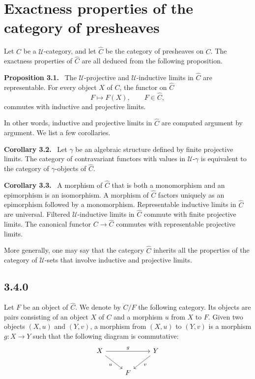 \documentclass[11pt]{article}
\newcommand{\U}{\mathcal{U}}
\newenvironment{statement}[1]{\par\medskip\noindent\textbf{#1.}\ }{\par\medskip}
\begin{document}
\section{Exactness properties of the category of presheaves}

Let $C$ be a $\U$-category, and let $\widehat C$ be the category of presheaves on $C$. The exactness properties of $\widehat C$ are all deduced from the following proposition.

\begin{statement}{Proposition 3.1}
The $\U$-projective and $\U$-inductive limits in $\widehat C$ are representable. For every object $X$ of $C$, the functor on $\widehat C$
\[
F\longmapsto F(X),\qquad F\in\widehat C,
\]
commutes with inductive and projective limits.

In other words, inductive and projective limits in $\widehat C$ are computed argument by argument. We list a few corollaries.
\end{statement}

\begin{statement}{Corollary 3.2}
Let $\gamma$ be an algebraic structure defined by finite projective limits. The category of contravariant functors with values in $\U$-$\gamma$ is equivalent to the category of $\gamma$-objects of $\widehat C$.
\end{statement}

\begin{statement}{Corollary 3.3}
A morphism of $\widehat C$ that is both a monomorphism and an epimorphism is an isomorphism. A morphism of $\widehat C$ factors uniquely as an epimorphism followed by a monomorphism. Representable inductive limits in $\widehat C$ are universal. Filtered $\U$-inductive limits in $\widehat C$ commute with finite projective limits. The canonical functor $C\to\widehat C$ commutes with representable projective limits.
\end{statement}

More generally, one may say that the category $\widehat C$ inherits all the properties of the category of $\U$-sets that involve inductive and projective limits.

\subsection*{3.4.0}
Let $F$ be an object of $\widehat C$. We denote by $C/F$ the following category. Its objects are pairs consisting of an object $X$ of $C$ and a morphism $u$ from $X$ to $F$. Given two objects $(X,u)$ and $(Y,v)$, a morphism from $(X,u)$ to $(Y,v)$ is a morphism $g:X\to Y$ such that the following diagram is commutative:
\[
\begin{tikzcd}
X\arrow[rr,"g"]\arrow[dr,"u"']&&Y\arrow[dl,"v"]\\
&F&
\end{tikzcd}
\]
\end{document}
